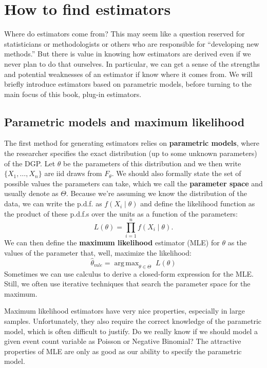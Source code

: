 \documentclass[
  letterpaper,
  DIV=11,
  numbers=noendperiod]{scrreprt}
\DeclareMathOperator*{\argmax}{arg\,max}
\theoremstyle{definition}
\theoremstyle{definition}
\theoremstyle{plain}
\theoremstyle{remark}
\begin{document}
\hypertarget{how-to-find-estimators}{%
\section{How to find estimators}\label{how-to-find-estimators}}

Where do estimators come from? This may seem like a question reserved
for statisticians or methodologists or others who are responsible for
``developing new methods.'' But there is value in knowing how estimators
are derived even if we never plan to do that ourselves. In particular,
we can get a sense of the strengths and potential weaknesses of an
estimator if know where it comes from. We will briefly introduce
estimators based on parametric models, before turning to the main focus
of this book, plug-in estimators.

\hypertarget{parametric-models-and-maximum-likelihood}{%
\subsection{Parametric models and maximum
likelihood}\label{parametric-models-and-maximum-likelihood}}

The first method for generating estimators relies on \textbf{parametric
models}, where the researcher specifies the exact distribution (up to
some unknown parameters) of the DGP. Let \(\theta\) be the parameters of
this distribution and we then write \(\{X_1, \ldots, X_n\}\) are iid
draws from \(F_{\theta}\). We should also formally state the set of
possible values the parameters can take, which we call the
\textbf{parameter space} and usually denote as \(\Theta\). Because we're
assuming we know the distribution of the data, we can write the p.d.f.
as \(f(X_i \mid \theta)\) and define the likelihood function as the
product of these p.d.f.s over the units as a function of the parameters:
\[
L(\theta) = \prod_{i=1}^n f(X_i \mid \theta).
\] We can then define the \textbf{maximum likelihood} estimator (MLE)
for \(\theta\) as the values of the parameter that, well, maximize the
likelihood: \[
\widehat{\theta}_{mle} = \argmax_{\theta \in \Theta} \; L(\theta)
\] Sometimes we can use calculus to derive a closed-form expression for
the MLE. Still, we often use iterative techniques that search the
parameter space for the maximum.

Maximum likelihood estimators have very nice properties, especially in
large samples. Unfortunately, they also require the correct knowledge of
the parametric model, which is often difficult to justify. Do we really
know if we should model a given event count variable as Poisson or
Negative Binomial? The attractive properties of MLE are only as good as
our ability to specify the parametric model.
\end{document}

